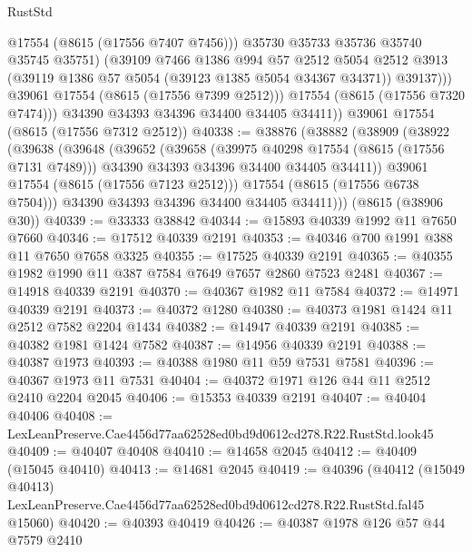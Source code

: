 \begin{lexlean}{RustStd}
\begin{coremodule}
                    @17554
                    (@8615 (@17556 @7407 @7456)))
                  @35730
                  @35733
                  @35736
                  @35740
                  @35745
                  @35751)
                (@39109
                  @7466
                  @1386
                  @994
                  @57
                  @2512
                  @5054
                  @2512
                  @3913
                  (@39119 @1386 @57 @5054 (@39123 @1385 @5054 @34367 @34371))
                  @39137)))
            @39061
            @17554
            (@8615 (@17556 @7399 @2512)))
          @17554
          (@8615 (@17556 @7320 @7474)))
        @34390
        @34393
        @34396
        @34400
        @34405
        @34411))
    @39061
    @17554
    (@8615 (@17556 @7312 @2512))
@40338 := @38876
    (@38882
      (@38909
        (@38922
          (@39638
            (@39648
              (@39652
                (@39658
                  (@39975 @40298 @17554 (@8615 (@17556 @7131 @7489)))
                  @34390
                  @34393
                  @34396
                  @34400
                  @34405
                  @34411))
              @39061
              @17554
              (@8615 (@17556 @7123 @2512)))
            @17554
            (@8615 (@17556 @6738 @7504)))
          @34390
          @34393
          @34396
          @34400
          @34405
          @34411)))
    (@8615 (@38906 @30))
@40339 := @33333 @38842
@40344 := @15893 @40339 @1992 @11 @7650 @7660
@40346 := @17512 @40339 @2191
@40353 := @40346 @700 @1991 @388 @11 @7650 @7658 @3325
@40355 := @17525 @40339 @2191
@40365 := @40355 @1982 @1990 @11 @387 @7584 @7649 @7657 @2860 @7523 @2481
@40367 := @14918 @40339 @2191
@40370 := @40367 @1982 @11 @7584
@40372 := @14971 @40339 @2191
@40373 := @40372 @1280
@40380 := @40373 @1981 @1424 @11 @2512 @7582 @2204 @1434
@40382 := @14947 @40339 @2191
@40385 := @40382 @1981 @1424 @7582
@40387 := @14956 @40339 @2191
@40388 := @40387 @1973
@40393 := @40388 @1980 @11 @59 @7531 @7581
@40396 := @40367 @1973 @11 @7531
@40404 := @40372 @1971 @126 @44 @11 @2512 @2410 @2204 @2045
@40406 := @15353 @40339 @2191
@40407 := @40404 @40406
@40408 := LexLeanPreserve.Cae4456d77aa62528ed0bd9d0612cd278.R22.RustStd.look45
@40409 := @40407 @40408
@40410 := @14658 @2045
@40412 := @40409 (@15045 @40410)
@40413 := @14681 @2045
@40419 := @40396
    (@40412
      (@15049 @40413)
      LexLeanPreserve.Cae4456d77aa62528ed0bd9d0612cd278.R22.RustStd.fal45
      @15060)
@40420 := @40393 @40419
@40426 := @40387 @1978 @126 @57 @44 @7579 @2410

\end{coremodule}
\end{lexlean}
